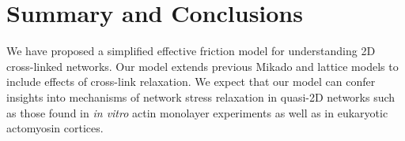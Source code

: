 \documentclass[pre,preprint]{revtex4-1}
\begin{document}

\section{Summary and Conclusions}
We have proposed a simplified effective friction model for understanding 2D cross-linked networks. Our model extends previous Mikado and lattice models to include effects of cross-link relaxation. We expect that our model can confer insights into mechanisms of network stress relaxation in quasi-2D networks such as those found in \textit{in vitro} actin monolayer experiments\cite{rheo_2D1} as well as in eukaryotic actomyosin cortices\cite{cellmech_flows}.   
\end{document}

